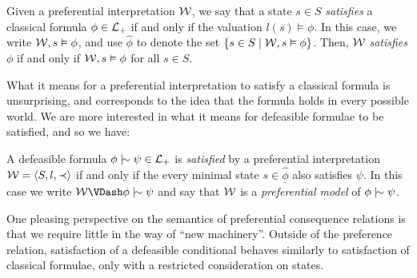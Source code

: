 \begin{definition}
	\label{definition:state-satisfaction}

	Given a preferential interpretation $\mathcal{W}$, we say that a state $s \in S$ \emph{satisfies} a classical formula
	$\phi \in \mathcal{L}_+$ if and only if the valuation $l(s) \vDash \phi$. In this case, we write $\mathcal{W}, s \vDash \phi$, and use
	$\hat{\phi}$ to denote the set $\{s \in S \mid \mathcal{W},s \vDash \phi \}$. Then, $\mathcal{W}$ \textit{satisfies} $\phi$ if and
	only if $\mathcal{W} , s \vDash \phi$ for all $s \in S$.
\end{definition}

What it means for a preferential interpretation to satisfy a classical formula is unsurprising, and corresponds to the
idea that the formula holds in every possible world. We are more interested in what it means for defeasible formulae to be
satisfied, and so we have:

\begin{definition}
	\label{definition:preferentially-satisfiable}

	A defeasible formula $\phi \twiddle \psi \in \Lang$ is \emph{satisfied} by a preferential interpretation $\mathcal{W} = \langle S,l,\prec \rangle$ if and
	only if the every minimal state $s \in \underline{\hat{\phi}}$ also satisfies $\psi$. In this case we write
	$\pin \VDash \phi \twiddle \psi$ and say that $\mathcal{W}$ is a \emph{preferential model} of $\phi \twiddle \psi$.
\end{definition}

One pleasing perspective on the semantics of preferential consequence relations is that we require little in the way of ``new
machinery''. Outside of the preference relation, satisfaction of a defeasible conditional behaves similarly to satisfaction
of classical formulae, only with a restricted consideration on states.

